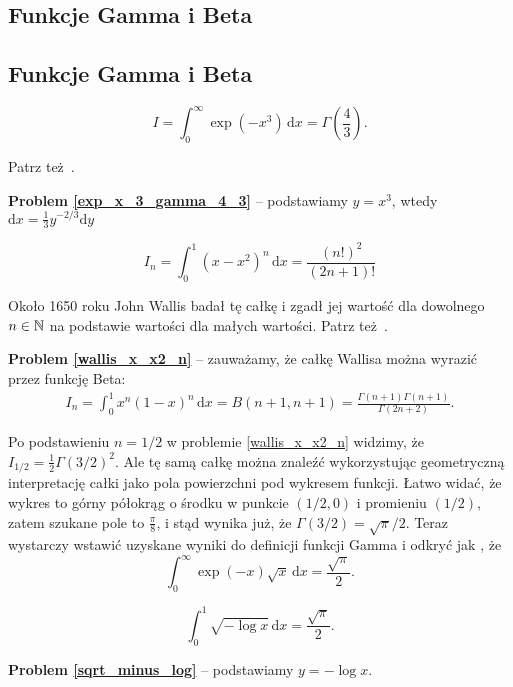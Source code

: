 \subsection{Funkcje Gamma i Beta}
\subsection{Funkcje Gamma i Beta}
\begin{problem}
\label{exp_x_3_gamma_4_3}%
    \begin{equation}
        I = \int_{0}^\infty \exp \left( -x^3 \right) \,\mathrm{d} x = \Gamma \left( \frac 4 3 \right).
    \end{equation}
\end{problem}

Patrz też \cite[s. 119]{nahin15}.

\textbf{Problem \ref{exp_x_3_gamma_4_3}} -- podstawiamy $y = x^3$, wtedy $\mathrm{d}x = \frac 1 3 y^{-2/3} \mathrm{d}y$

\begin{problem}
\label{wallis_x_x2_n}%
    \begin{equation}
        I_n = \int_{0}^1 (x-x^2)^n \,\mathrm{d} x = \frac{(n!)^2}{(2n+1)!}
    \end{equation}
\end{problem}

Około 1650 roku John Wallis badał tę całkę i zgadł jej wartość dla dowolnego $n \in {\mathbb N}$ na podstawie wartości dla małych wartości.
Patrz też \cite[s. 119-122]{nahin15}.

\textbf{Problem \ref{wallis_x_x2_n}} -- zauważamy, że całkę Wallisa można wyrazić przez funkcję Beta:
\begin{align}
	I_n = \int_{0}^1 x^n (1-x)^n \,\mathrm{d} x = B(n+1, n+1) = \frac{\Gamma(n+1) \Gamma(n+1)}{\Gamma(2n+2)}.
\end{align}

Po podstawieniu $n = 1/2$ w problemie \ref{wallis_x_x2_n} widzimy, że $I_{1/2} = \frac 1 2 \Gamma(3/2)^2$.
Ale tę samą całkę można znaleźć wykorzystując geometryczną interpretację całki jako pola powierzchni pod wykresem funkcji.
Łatwo widać, że wykres to górny półokrąg o środku w punkcie $(1/2, 0)$ i promieniu $(1/2)$, zatem szukane pole to $\frac \pi 8$, i stąd wynika już, że $\Gamma(3/2) = \sqrt{\pi}/2$.
Teraz wystarczy wstawić uzyskane wyniki do definicji funkcji Gamma i odkryć jak \cite[s. 123]{nahin15}, że
\begin{equation}
    \int_{0}^\infty \exp(-x) \sqrt{x} \,\mathrm{d} x = \frac{\sqrt \pi}{2}.
\end{equation}

\begin{problem}
\label{sqrt_minus_log}%
    \begin{equation}
        \int_{0}^1 \sqrt{- \log x} \,\mathrm{d} x = \frac{\sqrt \pi}{2}.
    \end{equation}
\end{problem}

\textbf{Problem \ref{sqrt_minus_log}} -- podstawiamy $y = - \log x$.
